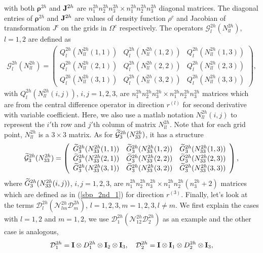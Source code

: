 with both ${\bm \rho}^{2h}$ and ${\bf J}^{2h}$ are $n_1^{2h}n_2^{2h}n_3^{2h}\times n_1^{2h}n_2^{2h}n_3^{2h}$ diagonal matrices. The diagonal entries of ${\bm \rho}^{2h}$ and ${\bf J}^{2h}$ are values of density function $\rho^c$ and Jacobian of transformation $J^c$ on the grids in $\Omega^c$ respectively.
The operators $\mathcal{G}_l^{2h}({N}_{ll}^{2h})$, $l=1,2$ are defined as
\begin{align}\label{g1122}
\mathcal{G}^{2h}_l({N}_{ll}^{2h}) = \left(\begin{array}{ccc}
Q_l^{2h}(N_{ll}^{2h}(1,1)) & Q_l^{2h}(N_{ll}^{2h}(1,2))  & Q_l^{2h}(N_{ll}^{2h}(1,3)) \\
Q_l^{2h}(N_{ll}^{2h}(2,1)) & Q_l^{2h}(N_{ll}^{2h}(2,2))  & Q_l^{2h}(N_{ll}^{2h}(2,3)) \\
Q_l^{2h}(N_{ll}^{2h}(3,1)) & Q_l^{2h}(N_{ll}^{2h}(3,2))  & Q_l^{2h}(N_{ll}^{2h}(3,3)) \end{array}\right),
\end{align}
with $Q_l^{2h}(N_{ll}^{2h}(i,j))$, $i,j = 1,2,3$, are $n_1^{2h}n_2^{2h}n_3^{2h}\times n_1^{2h}n_2^{2h}n_3^{2h}$ matrices which are from the central difference operator in direction $r^{(l)}$ for second derivative with variable coefficient. Here, we also use a matlab notation $N_{ll}^{2h}(i,j)$ to represent the $i'$th row and $j'$th column of matrix $N_{ll}^{2h}$. Note that for each grid point, $N_{ll}^{2h}$ is a $3\times3$ matrix. As for $\widetilde{\mathcal{G}}_3^{2h}({N}_{33}^{2h})$, it has a structure
\[ \widetilde{\mathcal{G}}^{2h}_3({N}_{33}^{2h}) = \left(\begin{array}{ccc}
\widetilde{G}_3^{2h}(N_{33}^{2h}(1,1)) & \widetilde{G}_3^{2h}(N_{33}^{2h}(1,2))  & \widetilde{G}_3^{2h}(N_{33}^{2h}(1,3)) \\
\widetilde{G}_3^{2h}(N_{33}^{2h}(2,1)) & \widetilde{G}_3^{2h}(N_{33}^{2h}(2,2))  & \widetilde{G}_3^{2h}(N_{33}^{2h}(2,3)) \\
\widetilde{G}_3^{2h}(N_{33}^{2h}(3,1)) & \widetilde{G}_3^{2h}(N_{33}^{2h}(3,2))  & \widetilde{G}_3^{2h}(N_{33}^{2h}(3,3)) \end{array}\right),\]
where $\widetilde{G}_3^{2h}(N_{33}^{2h}(i,j))$, $i,j = 1,2,3$, are $n_1^{2h}n_2^{2h}n_3^{2h}\times n_1^{2h}n_2^{2h}(n_3^{2h}+2)$ matrices which are defined as in (\ref{sbp_2nd_1}) for direction $r^{(3)}$. Finally, let's look at the terms $\mathcal{D}_l^{2h}(\mathcal{N}_{lm}^{2h}\mathcal{D}_m^{2h})$, $l = 1,2,3, m = 1,2,3, l\neq m$. We first explain the cases with $l = 1,2$ and $m = 1,2$, we use $\mathcal{D}_1^{2h}(\mathcal{N}_{12}^{2h}\mathcal{D}_2^{2h})$ as an example and the other case is analogous,
\begin{equation}\label{D12}
\mathcal{D}_1^{2h} = {\bf I}\otimes D_1^{2h} \otimes {\bf I}_2 \otimes {\bf I}_3,\ \ \ \mathcal{D}_2^{2h} ={\bf I}\otimes {\bf I}_1\otimes D_2^{2h}\otimes {\bf I}_3,
\end{equation}
